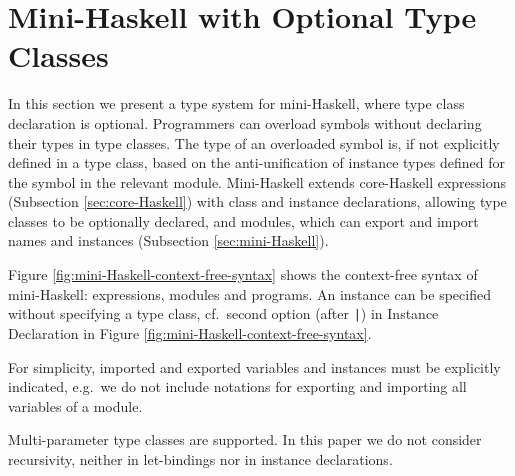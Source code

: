 \section{Mini-Haskell with Optional Type Classes}
\label{Optional-type-classes}

In this section we present a type system for mini-Haskell, where type
class declaration is optional. Programmers can overload symbols
without declaring their types in type classes. The type of an
overloaded symbol is, if not explicitly defined in a type class, based
on the anti-unification of instance types defined for the symbol in
the relevant module. Mini-Haskell extends core-Haskell expressions
(Subsection \ref{sec:core-Haskell}) with class and instance
declarations, allowing type classes to be optionally declared, and
modules, which can export and import names and instances (Subsection
\ref{sec:mini-Haskell}).

Figure \ref{fig:mini-Haskell-context-free-syntax} shows the
context-free syntax of mini-Haskell: expressions, modules and
programs. An instance can be specified without specifying a type
class, cf.~second option (after {\tt |}) in Instance Declaration in
Figure \ref{fig:mini-Haskell-context-free-syntax}.

For simplicity, imported and exported variables and instances must be
explicitly indicated, e.g.~we do not include notations for exporting
and importing all variables of a module.

Multi-parameter type classes are supported. In this paper we do not
consider recursivity, neither in let-bindings nor in instance
declarations. 

